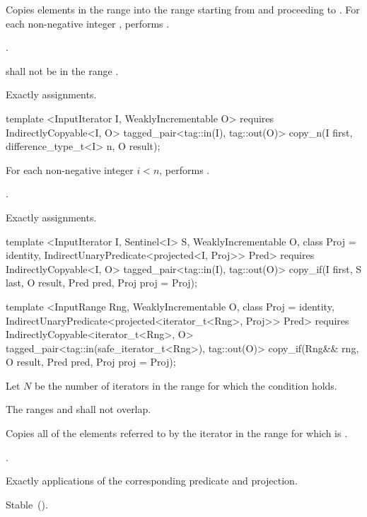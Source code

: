 \begin{itemdescr}
\pnum
\effects Copies elements in the range  into the range
 starting from  and
proceeding to . For each non-negative integer
, performs .

\pnum
\returns {}.

\pnum
\requires {} shall not be in the range .

\pnum
\complexity Exactly  assignments.
\end{itemdescr}

%
\begin{itemdecl}
template <InputIterator I, WeaklyIncrementable O>
  requires IndirectlyCopyable<I, O>
  tagged_pair<tag::in(I), tag::out(O)>
    copy_n(I first, difference_type_t<I> n, O result);
\end{itemdecl}

\begin{itemdescr}
\pnum
\effects For each non-negative integer
$i < n$, performs .

\pnum
\returns {}.

\pnum
\complexity Exactly  assignments.
\end{itemdescr}

%
\begin{itemdecl}
template <InputIterator I, Sentinel<I> S, WeaklyIncrementable O, class Proj = identity,
    IndirectUnaryPredicate<projected<I, Proj>> Pred>
  requires IndirectlyCopyable<I, O>
  tagged_pair<tag::in(I), tag::out(O)>
    copy_if(I first, S last, O result, Pred pred, Proj proj = Proj{});

template <InputRange Rng, WeaklyIncrementable O, class Proj = identity,
    IndirectUnaryPredicate<projected<iterator_t<Rng>, Proj>> Pred>
  requires IndirectlyCopyable<iterator_t<Rng>, O>
  tagged_pair<tag::in(safe_iterator_t<Rng>), tag::out(O)>
    copy_if(Rng&& rng, O result, Pred pred, Proj proj = Proj{});
\end{itemdecl}

\begin{itemdescr}
\pnum
Let $N$ be the number of iterators  in the range 
for which the condition  holds.

\pnum
\requires The ranges  and  shall not overlap.

\pnum
\effects Copies all of the elements referred to by the iterator  in the range 
for which  is .

\pnum
\returns {}.

\pnum
\complexity Exactly  applications of the corresponding predicate and projection.

\pnum
\remarks Stable~().
\end{itemdescr}


